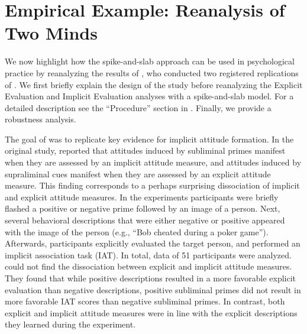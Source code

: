\documentclass[a4paper]{article}
\newenvironment{revision}{\color{black}}{\color{black}}
\begin{document}
\begin{revision}
\section*{Empirical Example: Reanalysis of Two Minds}
We now highlight how the spike-and-slab approach can be used in psychological practice by reanalyzing the results of \textcite{heycke2018two}, who conducted two registered replications of \textcite{rydell2006two}.
We first briefly explain the design of the study before reanalyzing the Explicit Evaluation and Implicit Evaluation analyses with a spike-and-slab model. For a detailed description see the ``Procedure'' section in \textcite{heycke2018two}. Finally, we provide a robustness analysis.

The goal of \textcite{heycke2018two} was to replicate key evidence for implicit attitude formation. 
In the original study, \textcite{rydell2006two} reported that attitudes induced by subliminal primes manifest when they are assessed by an implicit attitude measure, and attitudes induced by supraliminal cues manifest when they are assessed by an explicit attitude measure. 
This finding corresponds to a perhaps surprising dissociation of implicit and explicit attitude measures. 
In the \textcite{heycke2018two} experiments participants were briefly flashed a positive or negative prime followed by an image of a person.
Next, several behavioral descriptions that were either negative or positive appeared with the image of the person (e.g., ``Bob cheated during a poker game'').
Afterwards, participants explicitly evaluated the target person, and performed an implicit association task (IAT). 
In total, data of 51 participants were analyzed.
\textcite{heycke2018two} could not find the dissociation between explicit and implicit attitude measures. 
They found that while positive descriptions resulted in a more favorable explicit evaluation than negative descriptions, positive subliminal primes did not result in more favorable IAT scores than negative subliminal primes. 
In contrast, both explicit and implicit attitude measures were in line with the explicit descriptions they learned during the experiment.


\end{revision}
\end{document}
